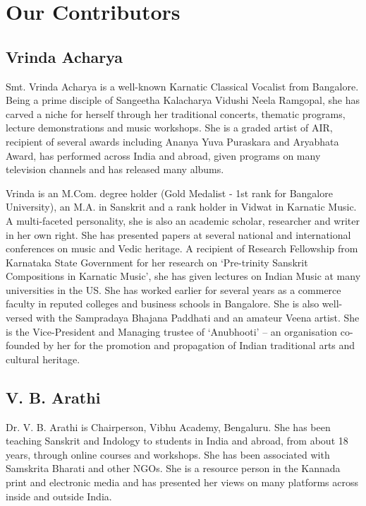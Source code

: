 
\chapter*{Our Contributors }\label{contributors}

\section*{Vrinda Acharya}

Smt. Vrinda Acharya is a well-known Karnatic Classical Vocalist from Bangalore. Being a prime disciple of Sangeetha Kalacharya Vidushi Neela Ramgopal, she has carved a niche for herself through her traditional concerts, thematic programs, lecture demonstrations and music workshops. She is a graded artist of AIR, recipient of several awards including Ananya Yuva Puraskara and Aryabhata Award, has performed across India and abroad, given programs on many television channels and has released many albums.

Vrinda is an M.Com. degree holder (Gold Medalist - 1st rank for Bangalore University), an M.A. in Sanskrit and a rank holder in Vidwat in Karnatic Music. A multi-faceted personality, she is also an academic scholar, researcher and writer in her own right. She has presented papers at several national and international conferences on music and Vedic heritage. A recipient of Research Fellowship from Karnataka State Government for her research on ‘Pre-trinity Sanskrit Compositions in Karnatic Music’, she has given lectures on Indian Music at many universities in the US. She has worked earlier for several years as a commerce faculty in reputed colleges and business schools in Bangalore. She is also well-versed with the Sampradaya Bhajana Paddhati and an amateur Veena artist. She is the Vice-President and Managing trustee of ‘Anubhooti’ – an organisation co-founded by her for the promotion and propagation of Indian traditional arts and cultural heritage.

\newpage

\section*{V. B. Arathi}

\vspace{-.2cm}

Dr. V. B. Arathi is Chairperson, Vibhu Academy, Bengaluru. She has been teaching Sanskrit and Indology to students in India and abroad, from about 18 years, through online courses and workshops. She has been associated with Samskrita Bharati and other NGOs. She is a resource person in the Kannada print and electronic media and has presented her views on many platforms across inside and outside India.

